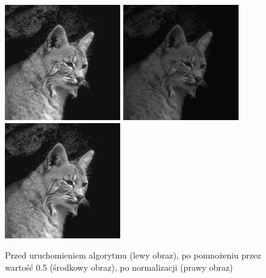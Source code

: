 \documentclass[a4paper,12pt]{book}
\begin{document}
\begin{figure}[H]
	\caption{Przed uruchomieniem algorytmu (lewy obraz), po pomnożeniu przez wartość 0.5 (środkowy obraz), po normalizacji (prawy obraz)}
	\includegraphics[width=5cm, height=5cm]{cat-unmodified.jpg}
	\includegraphics[width=5cm, height=5cm]{2/multiply-gray-const-3.png}
	\includegraphics[width=5cm, height=5cm]{2/multiply-gray-const-3-norm.png}
\end{figure}
\end{document}
